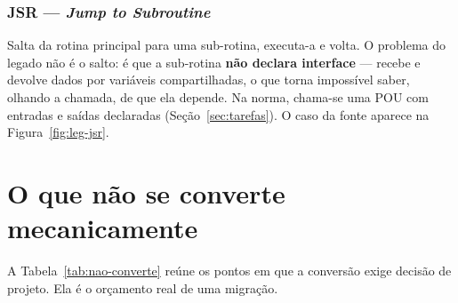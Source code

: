 

\subsubsection{JSR --- \emph{Jump to Subroutine}}

Salta da rotina principal para uma sub-rotina, executa-a e volta. O problema do legado não é o salto:
é que a sub-rotina \textbf{não declara interface} --- recebe e devolve dados por variáveis
compartilhadas, o que torna impossível saber, olhando a chamada, de que ela depende. Na norma, chama-se
uma POU com entradas e saídas declaradas (Seção~\ref{sec:tarefas}).
O caso da fonte aparece na Figura~\ref{fig:leg-jsr}.


\section{O que não se converte mecanicamente}

A Tabela~\ref{tab:nao-converte} reúne os pontos em que a conversão exige decisão de projeto. Ela é o
orçamento real de uma migração.

